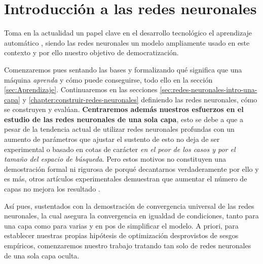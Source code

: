 
\chapter{Introducción a las redes neuronales} 
\label{chapter:Introduction-neuronal-networks}
Toma en la actualidad un papel clave en el desarrollo tecnológico el aprendizaje automático
\cite{importancia-arte-aprendizaje-automatico}, siendo 
las redes neuronales un modelo ampliamente usado en este contexto y por ello 
nuestro objetivo de democratización. 

Comenzaremos pues  sentando las bases y 
formalizando  
qué significa 
que una máquina \textit{aprenda}  y cómo puede conseguirse, 
todo ello en la sección \ref{sec:Aprendizaje}.
Continuaremos en las secciones \ref{sec:redes-neuronales-intro-una-capa} 
y \ref{chapter:construir-redes-neuronales}
definiendo las redes neuronales, cómo se construyen y evalúan. 
\label{motivo-una-capa}
\textbf{Centraremos además nuestros esfuerzos en el estudio de las redes neuronales de una sola capa}, 
esto se debe a que a pesar de la tendencia actual de utilizar redes neuronales profundas con 
un aumento de parámetros que ajustar 
\cite{a-universal-law-of-Robustness} \cite{CHAI2021100134} el sustento de esto no deja de ser experimental 
o basado en cotas de carácter \textit{en el peor de los casos y por el tamaño del espacio de búsqueda}.
Pero estos motivos no constituyen una demostración formal ni rigurosa de porqué decantarnos verdaderamente por 
ello y es más, otros artículos experimentales demuestran que aumentar el número de capas no mejora los resultado 
\cite{DBLP:conf/iwann/Linan-Villafranca21}. 

Así pues, sustentados con la demostración de convergencia universal \cite{HORNIK1989359}
de las redes neuronales, la cual asegura la convergencia en igualdad de condiciones, 
tanto para una capa como para varias
y en pos de simplificar el modelo. 
A priori, 
para establecer nuestras propias hipótesis de optimización desprovistos
de sesgos empíricos, comenzaremos nuestro trabajo tratando tan solo de redes neuronales de una sola capa oculta.